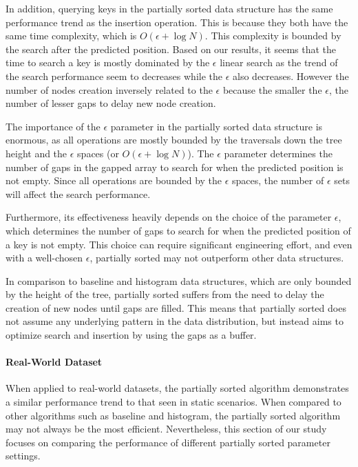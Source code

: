 \documentclass[11pt,a4paper]{article}
\begin{document}
In addition, querying keys in the partially sorted data structure has the same performance trend as the insertion operation. This is because they both have the same time complexity, which is $O(\epsilon+\log N)$. This complexity is bounded by the search after the predicted position. Based on our results, it seems that the time to search a key is mostly dominated by the $\epsilon$ linear search as the trend of the search performance seem to decreases while the $\epsilon$ also decreases. However the number of nodes creation inversely related to the $\epsilon$ because the smaller the $\epsilon$, the number of lesser gaps to delay new node creation. 

The importance of the $\epsilon$ parameter in the partially sorted data structure is enormous, as all operations are mostly bounded by the traversals down the tree height and the $\epsilon$ spaces (or $O(\epsilon+\log N)$). The $\epsilon$ parameter determines the number of gaps in the gapped array to search for when the predicted position is not empty. Since all operations are bounded by the $\epsilon$ spaces, the number of $\epsilon$ sets will affect the search performance. 

Furthermore, its effectiveness heavily depends on the choice of the parameter $\epsilon$, which determines the number of gaps to search for when the predicted position of a key is not empty. This choice can require significant engineering effort, and even with a well-chosen $\epsilon$, partially sorted may not outperform other data structures.

In comparison to baseline and histogram data structures, which are only bounded by the height of the tree, partially sorted suffers from the need to delay the creation of new nodes until gaps are filled. This means that partially sorted does not assume any underlying pattern in the data distribution, but instead aims to optimize search and insertion by using the gaps as a buffer.

\paragraph{Real-World Dataset} When applied to real-world datasets, the partially sorted algorithm demonstrates a similar performance trend to that seen in static scenarios. When compared to other algorithms such as baseline and histogram, the partially sorted algorithm may not always be the most efficient. Nevertheless, this section of our study focuses on comparing the performance of different partially sorted parameter settings.
\end{document}
